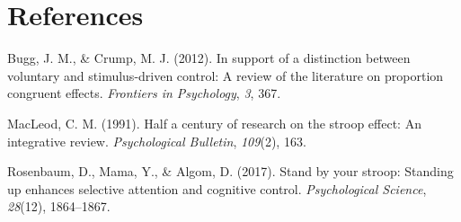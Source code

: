 \documentclass[
  man]{apa6}
\newlength{\cslhangindent}
\newlength{\cslentryspacingunit} %
\newenvironment{CSLReferences}[2] %
 {%
  \setlength{\parindent}{0pt}
  \ifodd #1
  \let\oldpar\par
  \def\par{\hangindent=\cslhangindent\oldpar}
  \fi
  \setlength{\parskip}{#2\cslentryspacingunit}
 }%
 {}
\begin{document}
\newpage

\hypertarget{references}{%
\section{References}\label{references}}

\begingroup
\setlength{\parindent}{-0.5in}
\setlength{\leftskip}{0.5in}

\hypertarget{refs}{}
\begin{CSLReferences}{1}{0}
\leavevmode{}%
Bugg, J. M., \& Crump, M. J. (2012). In support of a distinction between voluntary and stimulus-driven control: A review of the literature on proportion congruent effects. \emph{Frontiers in Psychology}, \emph{3}, 367.

\leavevmode{}%
MacLeod, C. M. (1991). Half a century of research on the stroop effect: An integrative review. \emph{Psychological Bulletin}, \emph{109}(2), 163.

\leavevmode{}%
Rosenbaum, D., Mama, Y., \& Algom, D. (2017). Stand by your stroop: Standing up enhances selective attention and cognitive control. \emph{Psychological Science}, \emph{28}(12), 1864--1867.

\end{CSLReferences}

\endgroup


\clearpage
\renewcommand{\listfigurename}{Figure captions}
\end{document}
